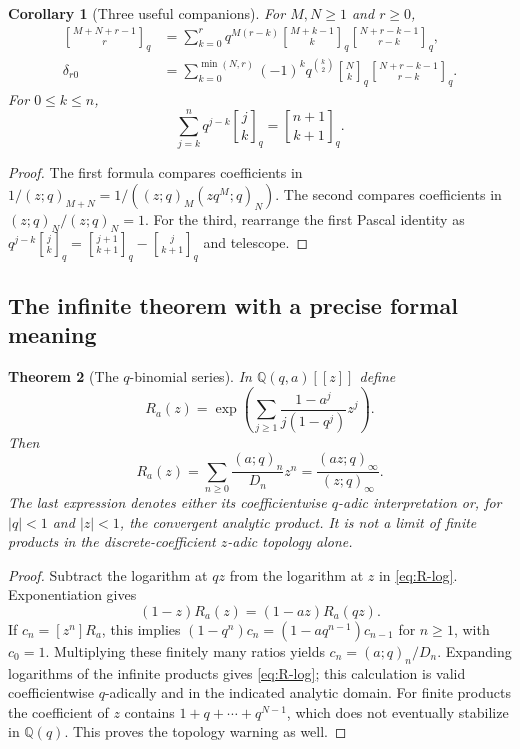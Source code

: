 \documentclass[11pt,a4paper]{article}
\numberwithin{equation}{section}
\newtheorem{theorem}{Theorem}[section]
\newtheorem{corollary}[theorem]{Corollary}
\theoremstyle{definition}
\theoremstyle{remark}
\newcommand{\Q}{\mathbb Q}
\newcommand{\qb}[2]{\genfrac{[}{]}{0pt}{}{#1}{#2}_{q}}
\newcommand{\poch}[3]{(#1;#2)_{#3}}
\begin{document}
\begin{corollary}[Three useful companions]\label{cor:companions}
For $M,N\ge1$ and $r\ge0$,
\begin{align}
 \qb{M+N+r-1}r
 &=\sum_{k=0}^r q^{M(r-k)}\qb{M+k-1}k\qb{N+r-k-1}{r-k},
 \label{eq:negative-vander}\\
 \delta_{r0}
 &=\sum_{k=0}^{\min(N,r)}(-1)^kq^{\binom k2}
     \qb Nk\qb{N+r-k-1}{r-k}.\label{eq:orth-product}
\end{align}
For $0\le k\le n$,
\begin{equation}\label{eq:hockey}
 \sum_{j=k}^n q^{j-k}\qb jk=\qb{n+1}{k+1}.
\end{equation}
\end{corollary}
\begin{proof}
The first formula compares coefficients in
$1/\poch zq{M+N}=1/(\poch zqM\poch{zq^M}qN)$.
The second compares coefficients in
$\poch zqN/\poch zqN=1$.
For the third, rearrange the first Pascal identity as
$q^{j-k}\qb jk=\qb{j+1}{k+1}-\qb j{k+1}$ and telescope.
\end{proof}

\subsection{The infinite theorem with a precise formal meaning}
\begin{theorem}[The $q$-binomial series]\label{thm:infinite}
In $\Q(q,a)[[z]]$ define
\begin{equation}\label{eq:R-log}
 R_a(z)=\exp\left(\sum_{j\ge1}\frac{1-a^j}{j(1-q^j)}z^j\right).
\end{equation}
Then
\begin{equation}\label{eq:qbinomial-series}
 R_a(z)=\sum_{n\ge0}\frac{\poch a q n}{D_n}z^n
       =\frac{\poch{az}q\infty}{\poch zq\infty}.
\end{equation}
The last expression denotes either its coefficientwise $q$-adic interpretation
or, for $|q|<1$ and $|z|<1$, the convergent analytic product. It is not a limit of
finite products in the discrete-coefficient $z$-adic topology alone.
\end{theorem}
\begin{proof}
Subtract the logarithm at $qz$ from the logarithm at $z$ in \eqref{eq:R-log}.
Exponentiation gives
\[
 (1-z)R_a(z)=(1-az)R_a(qz).
\]
If $c_n=[z^n]R_a$, this implies
$(1-q^n)c_n=(1-aq^{n-1})c_{n-1}$ for $n\ge1$, with $c_0=1$.
Multiplying these finitely many ratios yields $c_n=\poch a q n/D_n$.
Expanding logarithms of the infinite products gives \eqref{eq:R-log}; this
calculation is valid coefficientwise $q$-adically and in the indicated analytic
domain. For finite products the coefficient of $z$ contains
$1+q+\cdots+q^{N-1}$, which does not eventually stabilize in $\Q(q)$.
This proves the topology warning as well.
\end{proof}
\end{document}
